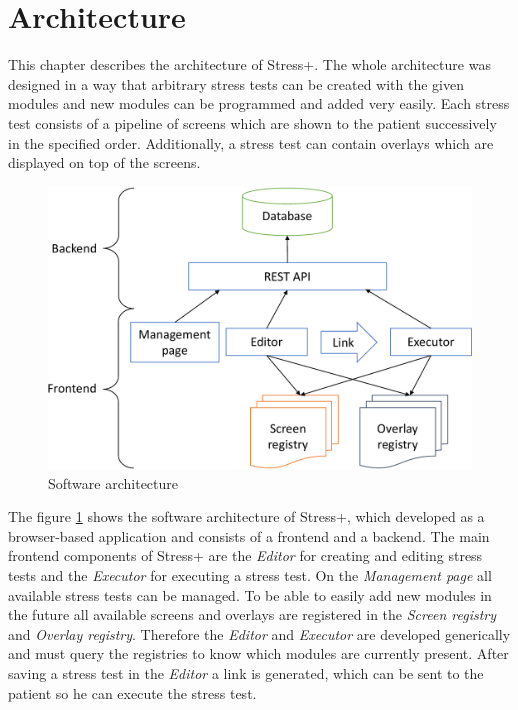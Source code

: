 \section{Architecture}
\label{sec:architecture}

This chapter describes the architecture of Stress+.
The whole architecture was designed in a way that arbitrary stress tests can be created with the given modules and new modules can be programmed and added very easily.
Each stress test consists of a pipeline of screens which are shown to the patient successively in the specified order.
Additionally, a stress test can contain overlays which are displayed on top of the screens.

\begin{figure}[htb]
  \centering
  \includegraphics[width=\textwidth]{figures/Architecture-crop}
  \caption{Software architecture}
  \label{fig:software-architecture}
\end{figure}

The figure \ref{fig:software-architecture} shows the software architecture of Stress+, which developed as a browser-based application and consists of a frontend and a backend.
The main frontend components of Stress+ are the \textit{Editor} for creating and editing stress tests and the \textit{Executor} for executing a stress test.
On the \textit{Management page} all available stress tests can be managed.
To be able to easily add new modules in the future all available screens and overlays are registered in the \textit{Screen registry} and \textit{Overlay registry}. 
Therefore the \textit{Editor} and \textit{Executor} are developed generically and must query the registries to know which modules are currently present.
After saving a stress test in the \textit{Editor} a link is generated, which can be sent to the patient so he can execute the stress test.

